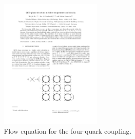 \documentclass[%
reprint,
superscriptaddress,
showpacs,preprintnumbers,
amsmath,amssymb,
aps,
prd,
]{revtex4-1}
\begin{document}
%
\begin{figure}[t]
\includegraphics[width=0.45\textwidth]{4quark}
\caption{Flow equation for the four-quark coupling.}\label{fig:4quark}
\end{figure}
%
\end{document}
